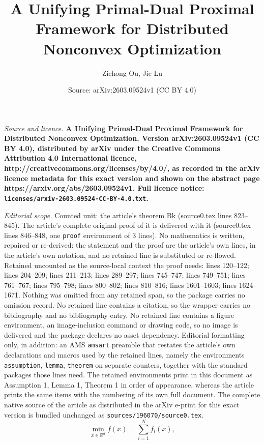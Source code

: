 \documentclass[10pt,a4paper]{amsart}
\title{\LARGE \bf A Unifying Primal-Dual Proximal Framework for Distributed Nonconvex Optimization}
\author{Zichong Ou, Jie Lu}
\date{Source: arXiv:2603.09524v1 (CC BY 4.0)}
\begin{document}
\maketitle

\noindent\emph{Source and licence.} \LARGE \bf A Unifying Primal-Dual Proximal Framework for Distributed Nonconvex Optimization. Version arXiv:2603.09524v1 (CC BY 4.0), distributed by arXiv under the Creative Commons Attribution 4.0 International licence, http://creativecommons.org/licenses/by/4.0/, as recorded in the arXiv licence metadata for this exact version and shown on the abstract page https://arxiv.org/abs/2603.09524v1. Full licence notice: \texttt{licenses/arxiv-2603.09524-CC-BY-4.0.txt}.\par\smallskip

\noindent\textit{Editorial scope.} Counted unit: the article's theorem Bk (source0.tex lines 823--845). The article's complete original proof of it is delivered with it (source0.tex lines 846--848, one \texttt{proof} environment of 3 lines). No mathematics is written, repaired or re-derived: the statement and the proof are the article's own lines, in the article's own notation, and no retained line is substituted or re-flowed.  Retained uncounted as the source-local context the proof needs: lines 120--122; lines 204--209; lines 211--213; lines 289--297; lines 745--747; lines 749--751; lines 761--767; lines 795--798; lines 800--802; lines 810--816; lines 1601--1603; lines 1624--1671.  Nothing was omitted from any retained span, so the package carries no omission record.  No retained line contains a citation, so the wrapper carries no bibliography and no bibliography entry.  No retained line contains a figure environment, an image-inclusion command or drawing code, so no image is delivered and the package declares no asset dependency.  Editorial formatting only, in addition: an AMS \texttt{amsart} preamble that restates the article's own declarations and macros used by the retained lines, namely the environments \texttt{assumption}, \texttt{lemma}, \texttt{theorem} on separate counters, together with the standard packages those lines need.  The retained environments print in this document as Assumption 1, Lemma 1, Theorem 1 in order of appearance, whereas the article prints the same items with the numbering of its own full document.  The complete native source of the article as distributed in the arXiv e-print for this exact version is bundled unchanged as \texttt{sources/196070/source0.tex}.
\begin{equation}
\min _{x \in \mathbb{R}^{d}} f(x)= \sum_{i=1}^{N} f_{i}(x), \label{p1}
\end{equation}
\end{document}
